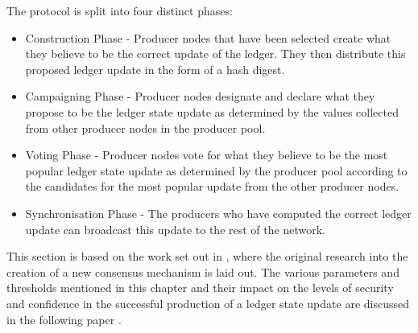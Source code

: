 The protocol is split into four distinct phases:

\begin{itemize}

\item Construction Phase - Producer nodes that have been selected create what they believe to be the correct update of the ledger. They then distribute this proposed ledger update in the form of a hash digest.
\item Campaigning Phase - Producer nodes designate and declare what they propose to be the ledger state update as determined by the values collected from other producer nodes in the producer pool.
\item Voting Phase - Producer nodes vote for what they believe to be the most popular ledger state update as determined by the producer pool according to the candidates for the most popular update from the other producer nodes.
\item Synchronisation Phase - The producers who have computed the correct ledger update can broadcast this update to the rest of the network.

\end{itemize}

This section is based on the work set out in \cite{catalystresearch}, where the original research into the creation of a new consensus mechanism is laid out. The various parameters and thresholds mentioned in this chapter and their impact on the levels of security and confidence in the successful production of a ledger state update are discussed in the following paper \cite{catalystresearch2}.
